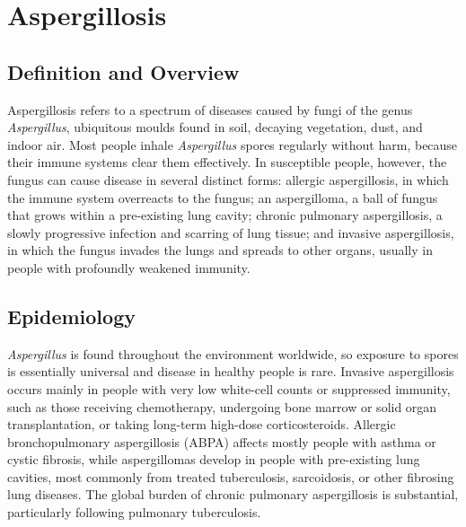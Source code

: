 \chapter{Aspergillosis}

\section*{Definition and Overview}
Aspergillosis refers to a spectrum of diseases caused by fungi of the genus \textit{Aspergillus}, ubiquitous moulds found in soil, decaying vegetation, dust, and indoor air. Most people inhale \textit{Aspergillus} spores regularly without harm, because their immune systems clear them effectively. In susceptible people, however, the fungus can cause disease in several distinct forms: allergic aspergillosis, in which the immune system overreacts to the fungus; an aspergilloma, a ball of fungus that grows within a pre-existing lung cavity; chronic pulmonary aspergillosis, a slowly progressive infection and scarring of lung tissue; and invasive aspergillosis, in which the fungus invades the lungs and spreads to other organs, usually in people with profoundly weakened immunity.

\section*{Epidemiology}
\textit{Aspergillus} is found throughout the environment worldwide, so exposure to spores is essentially universal and disease in healthy people is rare. Invasive aspergillosis occurs mainly in people with very low white-cell counts or suppressed immunity, such as those receiving chemotherapy, undergoing bone marrow or solid organ transplantation, or taking long-term high-dose corticosteroids. Allergic bronchopulmonary aspergillosis (ABPA) affects mostly people with asthma or cystic fibrosis, while aspergillomas develop in people with pre-existing lung cavities, most commonly from treated tuberculosis, sarcoidosis, or other fibrosing lung diseases. The global burden of chronic pulmonary aspergillosis is substantial, particularly following pulmonary tuberculosis.

